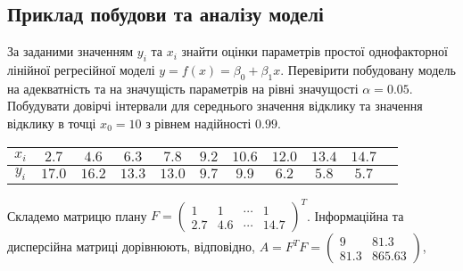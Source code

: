 \subsection{Приклад побудови та аналізу моделі}
За заданими значенням $y_i$ та $x_i$ знайти оцінки параметрів простої однофакторної лінійної регресійної
моделі $y = f(x) = \beta_0 + \beta_1 x$. Перевірити побудовану модель на адекватність та на значущість параметрів на рівні значущості $\alpha=0.05$.
Побудувати довірчі інтервали для середнього значення відклику та значення відклику в точці $x_0 = 10$ з рівнем надійності $0.99$.
\begin{center}
    \begin{tabular}{|c|c|c|c|c|c|c|c|c|c|c|}
        \hline
        $x_i$ & $2.7$ & $4.6$ & $6.3$ & $7.8$ & $9.2$ & $10.6$ & $12.0$ & $13.4$ & $14.7$ \\
        \hline
        $y_i$ & $17.0$ & $16.2$ & $13.3$ & $13.0$ & $9.7$ & $9.9$ & $6.2$ & $5.8$ & $5.7$ \\
        \hline
    \end{tabular}
\end{center}
\begin{center}
\end{center}
Складемо матрицю плану $F = \begin{pmatrix}
    1 & 1 & \cdots & 1 \\
    2.7 & 4.6 & \cdots & 14.7
\end{pmatrix}^T$. Інформаційна та дисперсійна матриці дорівнюють, відповідно,
$A = F^T F= \begin{pmatrix}
    9 & 81.3 \\
    81.3 & 865.63
\end{pmatrix}$,
